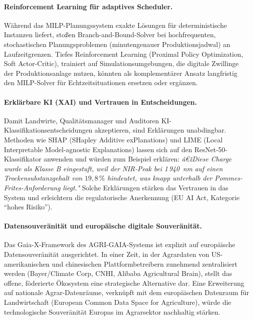 ﻿\documentclass[12pt,a4paper]{article}
\theoremstyle{plain}
\theoremstyle{definition}
\begin{document}
	\paragraph{Reinforcement Learning für adaptives Scheduler.}
	Während das MILP-Planungs\-system exakte Lösungen für deterministische
	Instanzen liefert, stoßen Branch-and-Bound-Solver bei hochfrequenten,
	stochastischen Planungsproblemen (minutengenauer Produktionsjadwal)
	an Laufzeitgrenzen. Tiefes Reinforcement Learning (Proximal Policy
	Optimization, Soft Actor-Critic), trainiert auf Simulationsumgebungen,
	die digitale Zwillinge der Produktionsanlage nutzen, könnten als
	komplementärer Ansatz langfristig den MILP-Solver für Echtzeitsituationen
	ersetzen oder ergänzen.

	\paragraph{Erklärbare KI (XAI) und Vertrauen in Entscheidungen.}
	Damit Landwirte, Qualitätsmanager und Auditoren KI-Klassifikationsentscheidungen
	akzeptieren, sind Erklärungen unabdingbar. Methoden wie SHAP
	(SHapley Additive exPlanations) und LIME (Local Interpretable
	Model-agnostic Explanations) lassen sich auf den ResNet-50-Klassifikator
	anwenden und würden zum Beispiel erklären: \textit{â€žDiese Charge
	wurde als Klasse B eingestuft, weil der NIR-Peak bei 1\,940~nm
	auf einen Trockensubstanzgehalt von $19{,}8\,\%$ hindeutet, was
	knapp unterhalb der Pommes-Frites-Anforderung liegt."} Solche
	Erklärungen stärken das Vertrauen in das System und erleichtern
	die regulatorische Anerkennung (EU AI Act, Kategorie ``hohes Risiko'').

	\paragraph{Datensouveränität und europäische digitale Souveränität.}
	Das Gaia-X-Framework des AGRI-GAIA-Systems ist explizit auf
	europäische Datensouveränität ausgerichtet. In einer Zeit, in der
	Agrardaten von US-amerikanischen und chinesischen Plattformbetreibern
	zunehmend zentralisiert werden (Bayer/Climate Corp, CNHI,
	Alibaba Agricultural Brain), stellt das offene, föderierte
	Ökosystem eine strategische Alternative dar. Eine Erweiterung
	auf nationale Agrar-Datenräume, verknüpft mit dem europäischen
	Datenraum für Landwirtschaft (European Common Data Space
	for Agriculture), würde die technologische Souveränität Europas
	im Agrarsektor nachhaltig stärken.
\end{document}
